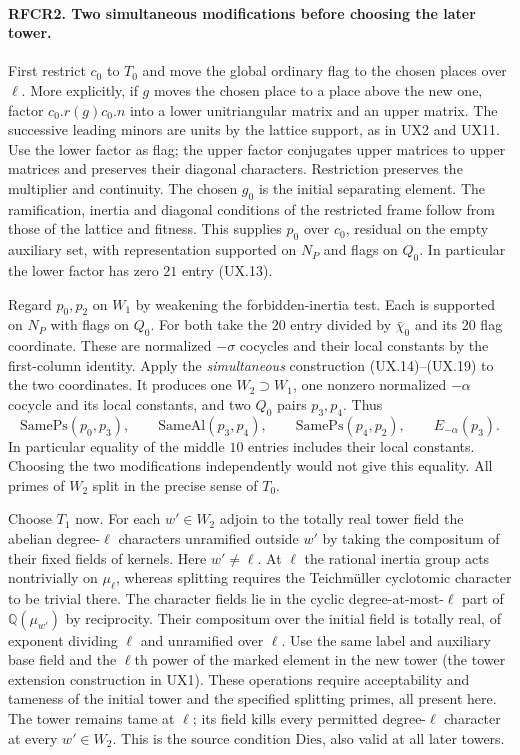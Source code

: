 \paragraph{RFCR2. Two simultaneous modifications before choosing the later tower.}
First restrict $c_0$ to $T_0$ and move the global ordinary flag to
the chosen places over $\ell$. More explicitly, if $g$ moves the
chosen place to a place above the new one, factor $c_0.r(g)c_0.n$
into a lower unitriangular matrix and an upper matrix. The successive
leading minors are units by the lattice support, as in UX2 and UX11.
Use the lower factor as flag; the upper factor conjugates upper matrices
to upper matrices and preserves their diagonal characters. Restriction
preserves the multiplier and continuity. The chosen $g_0$ is the
initial separating element. The ramification, inertia and diagonal
conditions of the restricted frame follow from those of the lattice
and fitness. This supplies $p_0$ over $c_0$, residual on the empty
auxiliary set, with representation supported on $N_P$ and flags on
$Q_0$. In particular the lower factor has zero $21$ entry (UX.13).

Regard $p_0,p_2$ on $W_1$ by weakening the forbidden-inertia test.
Each is supported on $N_P$ with flags on $Q_0$. For both take the
$20$ entry divided by $\bar\chi_0$ and its $20$ flag coordinate.
These are normalized $-\sigma$ cocycles and their local constants
by the first-column identity. Apply the \emph{simultaneous}
construction (UX.14)--(UX.19) to the two coordinates. It produces
one $W_2\supset W_1$, one nonzero normalized $-\alpha$ cocycle
and its local constants, and two $Q_0$ pairs $p_3,p_4$. Thus
\[
 \mathrm{SamePs}(p_0,p_3),\qquad
 \mathrm{SameAl}(p_3,p_4),\qquad
 \mathrm{SamePs}(p_4,p_2),\qquad E_{-\alpha}(p_3).
\]
In particular equality of the middle $10$ entries includes their local
constants. Choosing the two modifications independently would not
give this equality. All primes of $W_2$ split in the precise sense
of $T_0$.

Choose $T_1$ now. For each $w'\in W_2$ adjoin to the totally real
tower field the abelian degree-$\ell$ characters unramified outside
$w'$ by taking the compositum of their fixed fields of kernels.
Here $w'\ne\ell$. At $\ell$ the rational inertia group acts
nontrivially on $\mu_\ell$, whereas splitting requires the
Teichm\"uller cyclotomic character to be trivial there.
The character fields lie in the cyclic degree-at-most-$\ell$ part
of $\mathbb Q(\mu_{w'})$ by reciprocity. Their compositum over the
initial field is totally real, of exponent dividing $\ell$ and
unramified over $\ell$. Use the same label and auxiliary base field
and the $\ell$th power of the marked element in the new tower
(the tower extension construction in UX1). These operations require
acceptability and tameness of the initial tower and the specified
splitting primes, all present here. The tower remains tame at $\ell$;
its field kills every permitted degree-$\ell$ character at every
$w'\in W_2$. This is the source condition $\mathrm{Dies}$, also
valid at all later towers.

